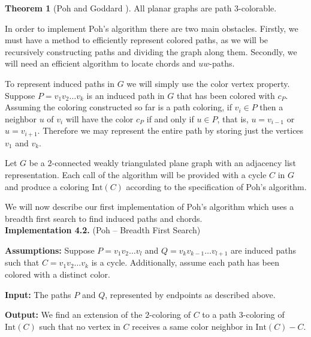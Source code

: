 \documentclass[letterpaper, 12pt]{article}
\theoremstyle{definition}
\theoremstyle{definition}
\theoremstyle{thm}
\newtheorem{theorem}{Theorem}[section]
\theoremstyle{definition}
\begin{document}
\begin{theorem}[Poh \cite{poh} and Goddard \cite{goddard}]
All planar graphs are path $3$-colorable.
\end{theorem}

In order to implement Poh's algorithm there are two main obstacles. Firstly, we
must have a method to efficiently represent colored paths, as we
will be recursively constructing paths and dividing the graph along them.
Secondly, we will need an efficient algorithm to locate chords and $uw$-paths.

To represent induced paths in $G$ we will simply use the color
vertex property. Suppose $P=v_1v_2\ldots v_k$ is an induced path in $G$ that has
been colored with $c_P$. Assuming the coloring constructed so far
is a path coloring, if $v_i\in P$ then a neighbor $u$ of $v_i$ will
have the color $c_P$ if and only if $u\in P$, that is, $u=v_{i-1}$ or $u=v_{i+1}$.
Therefore we may represent the entire path by storing just the vertices $v_1$
and $v_k$. 

Let $G$ be a $2$-connected weakly triangulated plane graph with an adjacency
list representation. Each call of the algorithm will be provided with a cycle
$C$ in $G$ and produce a coloring $\text{Int}(C)$ according to the specification
of Poh's algorithm.

We will now describe our first implementation of Poh's algorithm which uses a
breadth first search to find induced paths and chords.\\

\noindent\textbf{Implementation 4.2.} (Poh -- Breadth First Search)

\noindent\textbf{Assumptions:} Suppose $P=v_1v_2\ldots v_l$ and
$Q=v_kv_{k-1}\ldots v_{l+1}$ are induced
paths such that $C=v_1v_2\ldots v_k$ is a cycle. Additionally, assume each
path has been colored with a distinct color.

\noindent\textbf{Input:} The paths $P$ and $Q$, represented by endpoints as
described above.

\noindent\textbf{Output:} We find an extension of the $2$-coloring of $C$ to
a path $3$-coloring of $\text{Int}(C)$ such that
no vertex in $C$ receives a same color neighbor in $\text{Int}(C)-C$.
\end{document}
